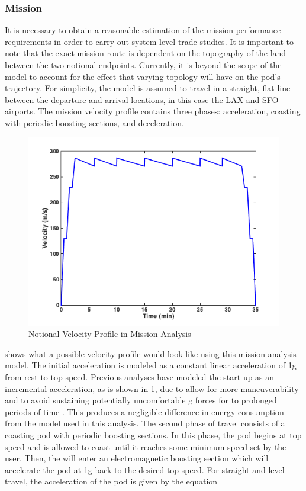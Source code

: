 \subsubsection{Mission}
	It is necessary to obtain a reasonable estimation of the mission performance requirements in order to carry out system level trade studies. It is important to note that the exact mission route is dependent on the topography of the land between the two notional endpoints. Currently, it is beyond the scope of the model to account for the effect that varying topology will have on the pod’s trajectory. For simplicity, the model is assumed to travel in a straight, flat line between the departure and arrival locations, in this case the LAX and SFO airports. The mission velocity profile contains three phases: acceleration, coasting with periodic boosting sections, and deceleration.
	\begin{figure}
		\centering
		\includegraphics{../images/mission_profile.png}
		\caption{Notional Velocity Profile in Mission Analysis}
		\label{fig:mission_profile}
	\end{figure}
	 shows what a possible velocity profile would look like using this mission analysis model. The initial acceleration is modeled as a constant linear acceleration of 1g from rest to top speed. Previous analyses have modeled the start up as an incremental acceleration, as is shown in \cref{fig:mission_profile}, due to allow for more maneuverability and to avoid sustaining potentially uncomfortable g forces for to prolonged periods of time \cite{Chin}. This produces a negligible difference in energy consumption from the model used in this analysis. The second phase of travel consists of a coasting pod with periodic boosting sections. In this phase, the pod begins at top speed and is allowed to coast until it reaches some minimum speed set by the user. Then, the will enter an electromagnetic boosting section which will accelerate the pod at 1g back to the desired top speed. For straight and level travel, the acceleration of the pod is given by the equation
